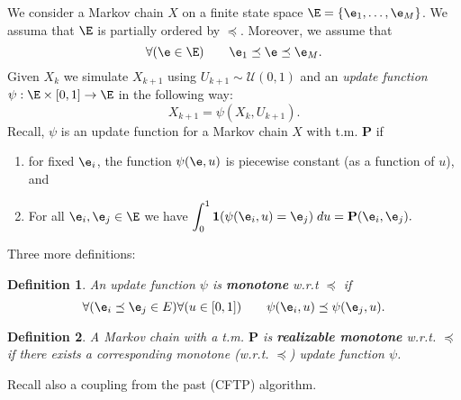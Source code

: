 \documentclass[a4paper,12pt]{article}
\newtheorem{deff}{Definition}
\begin{document}
 
\noindent
 {
\setlength\fboxsep{4pt}%
 \setlength\fboxrule{2pt}%
 }
\bigskip\bigskip
 
% 

\par \bigskip 
We consider a Markov chain $X$ on a finite state space $\E=\{\e_1,\ldots,\e_M\}$.
We assuma that $\E$ is partially ordered by $\preceq$. Moreover,
we assume that 
$$\forall(\e\in\E)\qquad \e_1\preceq \e\preceq \e_M.$$
Given $X_k$ we simulate $X_{k+1}$ using $U_{k+1}\sim\mathcal{U}(0,1)$ and an \textsl{update function} $\psi: \E\times[0,1]\to\E$ in the following way:
$$X_{k+1}=\psi(X_k,U_{k+1}).$$
Recall, $\psi$ is an update function for a Markov chain $X$ with t.m. $\mathbf{P}$ 
if 
\begin{enumerate}
 \item for fixed $\e_i$, the function $\psi(\e,u)$ is piecewise constant 
 (as a function of $u$), and
 \item For all $\e_i, \e_j\in\E$ we have $\displaystyle \int_0^1 \boldsymbol{1}(\psi(\e_i,u)=\e_j)\; du = \mathbf{P}(\e_i,\e_j).$
\end{enumerate}
Three more definitions:
\medskip\par 
\begin{deff}
 An update function $\psi$ is \textbf{monotone} w.r.t $\preceq$ if
 $$\forall(\e_i\preceq\e_j\in E) \forall(u\in[0,1])\qquad \psi(\e_i,u)\preceq\psi(\e_j,u).$$
\end{deff}
\medskip\par 
\begin{deff}
A Markov chain with a t.m. $\mathbf{P}$ is \textbf{realizable monotone} w.r.t. $\preceq$ if there exists a corresponding monotone (w.r.t. $\preceq$) update 
function $\psi$.
\end{deff}
\medskip\par 
Recall also a coupling from the past (CFTP) algorithm.
\end{document}
